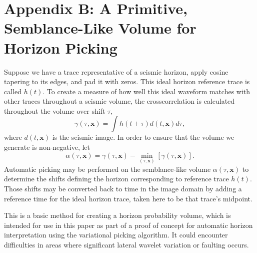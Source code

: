 \appendix
\section{Appendix B: A Primitive, Semblance-Like Volume for Horizon Picking}
Suppose we have a trace representative of a seismic horizon, apply cosine tapering to its edges, and pad it  with zeros.  This ideal horizon reference trace is called $h(t)$.  To create a measure of how well this ideal waveform matches with other traces throughout a seismic volume, the crosscorrelation is calculated throughout the volume over shift $\tau$,
\begin{equation}
\label{eq:horiz-xcor}
\gamma(\tau,\mathbf{x}) = \int h(t+\tau)d(t,\mathbf{x}) d\tau,
\end{equation}
where $d(t,\mathbf{x})$ is the seismic image.  In order to ensure that the volume we generate is non-negative, let
\begin{equation}
\label{eq:alpha-horiz}
\alpha(\tau,\mathbf{x}) = \gamma(\tau,\mathbf{x}) - \min_{\left(\tau,\mathbf{x}\right)} \left[ \gamma(\tau,\mathbf{x})\right] .
\end{equation}
Automatic picking may be performed on the semblance-like volume $\alpha(\tau,\mathbf{x})$ to determine the shifts defining the horizon corresponding to reference trace $h(t)$.  Those shifts may be converted back to time in the image domain by adding a reference time for the ideal horizon trace, taken here to be that trace's midpoint.

This is a basic method for creating a horizon probability volume, which is intended for use in this paper as part of a proof of concept for automatic horizon interpretation using the variational picking algorithm.  It could encounter difficulties in areas where significant lateral wavelet variation or faulting occurs.




